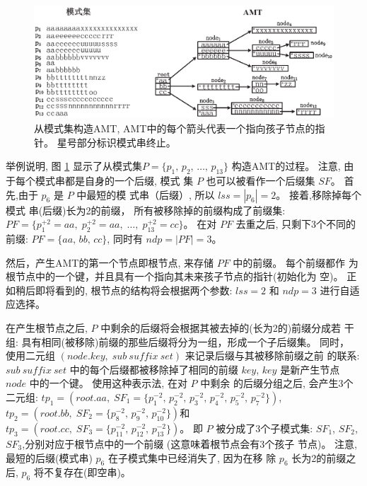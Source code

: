\begin{figure}[H]
  \centering
  \includegraphics[width=\textwidth]{figures/2_MPM/AMT}
  \caption{从模式集构造AMT, AMT中的每个箭头代表一个指向孩子节点的指针。
    星号部分标识模式串终止。}
  \label{fig:AMT}
\end{figure}

举例说明, 图 \ref{fig:AMT} 显示了从模式集$P = \{p_1,\, p_2,\, \dots,\,
p_{13}\}$ 构造AMT的过程。 注意, 由于每个模式串都是自身的一个后缀, 模式
集 $P$ 也可以被看作一个后缀集 $SF$。 首先,由于 $p_6$ 是 $P$ 中最短的模
式串（后缀）, 所以 $lss = |p_6| = 2$。 接着,移除掉每个模式
串(后缀)长为2的前缀， 所有被移除掉的前缀构成了前缀集:
$PF = \{p_1^{+2} = aa,\; p_2^{+2} = aa,\; \dots,\; p_{13}^{+2} =
cc\}$。  在对 $PF$ 去重之后, 只剩下3个不同的前缀: $PF = \{aa,\, bb,\,
cc\}$, 同时有 $ndp = |PF| = 3$。

然后，产生AMT的第一个节点即根节点, 来存储 $PF$ 中的前缀。 每个前缀都作
为根节点中的一个键，并且具有一个指向其未来孩子节点的指针(初始化为
空)。 正如稍后即将看到的, 根节点的结构将会根据两个参数:
$lss=2$ 和 $ndp=3$ 进行自适应选择。

在产生根节点之后, $P$ 中剩余的后缀将会根据其被去掉的(长为2的)前缀分成若
干组: 具有相同(被移除)前缀的那些后缀将分为一组，形成一个子后缀集。 同时，
使用二元组 $(node.key,\; sub~suffix~set)$ 来记录后缀与其被移除前缀之前
的联系: $sub~suffix~set$ 中的每个后缀都被移除掉了相同的前缀 $key$,
$key$ 是新产生节点 $node$ 中的一个键。 使用这种表示法, 在对 $P$ 中剩余
的后缀分组之后, 会产生3个二元组:
$tp_1 = (root.aa,\; SF_1=\{p_1^{-2},\, p_2^{-2},\, p_3^{-2},\,
p_4^{-2},\, p_5^{-2},\, p_7^{-2}\})$,\,
$tp_2 = (root.bb,\; SF_2=\{p_8^{-2},\, p_9^{-2},\,
p_{10}^{-2}\})$和$tp_3 = (root.cc,\; SF_3=\{p_{11}^{-2},\,
p_{12}^{-2},\, p_{13}^{-2}\})$。 即 $P$ 被分成了3个子模式集: $SF_1$,
$SF_2$, $SF_3$,分别对应于根节点中的一个前缀 (这意味着根节点会有3个孩子
节点)。 注意, 最短的后缀(模式串) $p_6$ 在子模式集中已经消失了, 因为在移
除 $p_6$ 长为2的前缀之后, $p_6$ 将不复存在(即空串)。

